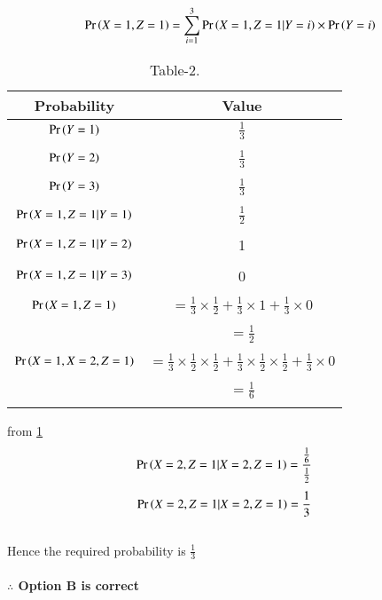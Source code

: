 \documentclass[journal,12pt,twocolumn]{IEEEtran}
\begin{document}
\begin{align}
    \Pr\left(X=1,Z=1\right)=\sum_{i=1}^{3}\Pr\left(X=1,Z=1|Y=i\right)\times \Pr\left(Y=i\right)
\end{align}
\newpage
\begin{table}[h!]
\resizebox{10cm}{!}
{
    \begin{tabular}{|c|c|}
         \hline
         Probability & Value\\
         \hline
         $\Pr\left(Y=1\right)$ & $\frac{1}{3}$\\&\\
         \hline
         $\Pr\left(Y=2\right)$ & $\frac{1}{3}$\\&\\
         \hline
         $\Pr\left(Y=3\right)$ & $\frac{1}{3}$\\&\\
         \hline
         $\Pr\left(X=1,Z=1|Y=1\right)$ & $\frac{1}{2}$ \\&\\
         \hline
         $\Pr\left(X=1,Z=1|Y=2\right)$ & 1\\&\\
         \hline
         $\Pr\left(X=1,Z=1|Y=3\right)$  & 0 \\&\\
         \hline
         $\Pr\left(X=1,Z=1\right)$ & $=\frac{1}{3}\times \frac{1}{2}+\frac{1}{3}\times 1+\frac{1}{3} \times 0$\\&\\ &$=\frac{1}{2}$\\&\\
         \hline
         $\Pr\left(X=1,X=2,Z=1\right)$ & $=\frac{1}{3}\times \frac{1}{2}\times \frac{1}{2}+\frac{1}{3}\times \frac{1}{2}\times \frac{1}{2}+\frac{1}{3}\times 0$\\&\\&$=\frac{1}{6}$\\&\\
         \hline
    \end{tabular}
    }
    \caption{\label{tab:Table-2}Table-2.}
\end{table}
from \ref{tab:Table-2} 
\begin{align}
\Pr\left(X=2,Z=1|X=2,Z=1\right)&=\frac{\frac{1}{6}}{\frac{1}{2}}
\end{align}
\begin{align}
\Pr\left(X=2,Z=1|X=2,Z=1\right)&=\frac{1}{3}
\end{align}
\\Hence the required probability is $\frac{1}{3}$\\
 \\ \textbf{$\therefore$ Option B is correct}
\end{document}

